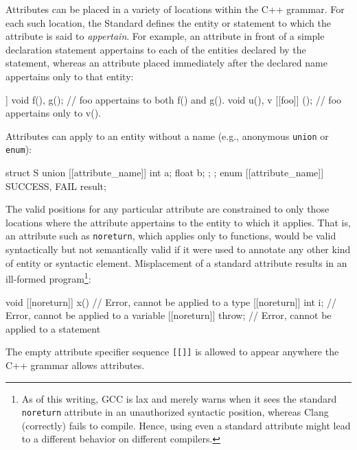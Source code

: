 Attributes can be placed in a variety of locations within the C++ grammar.  For each such location, the Standard defines the entity or statement to which the attribute is said to \emph{appertain}. For example, an attribute in front of a simple declaration statement appertains to each of the entities declared by the statement, whereas an attribute placed immediately after the declared name appertains only to that entity:

\begin{emcppslisting}[language=C]
[[foo]] void f(), g();   // foo appertains to both f() and g().
void u(), v [[foo]] ();  // foo appertains only to v().
\end{emcppslisting}

\noindent Attributes can apply to an entity without a name (e.g., anonymous \lstinline!union! or \lstinline!enum!):

\begin{emcppslisting}
struct S { union [[attribute_name]] { int a; float b; }; };
enum [[attribute_name]] { SUCCESS, FAIL } result;
\end{emcppslisting}

\noindent The valid positions for any particular attribute are constrained to only those locations
where the attribute appertains to the entity to which it applies. That is, an attribute such as \lstinline!noreturn!,
which applies only to functions, would be valid syntactically but not semantically valid if it were used to annotate
any other kind of entity or syntactic element.  Misplacement of a standard attribute results
in an ill-formed program\footnote{As of this writing, GCC is lax and merely
warns when it sees the standard \lstinline!noreturn! attribute in an
unauthorized syntactic position, whereas Clang (correctly) fails to
compile. Hence, using even a standard attribute might
  lead to a different behavior on different compilers.}:

\begin{emcppslisting}[emcppserrorlines={4}]
void [[noreturn]] x() {       // Error, cannot be applied to a type
     [[noreturn]] int i;      // Error, cannot be applied to a variable
     [[noreturn]] { throw; }  // Error, cannot be applied to a statement
}
\end{emcppslisting}

\noindent The empty attribute specifier sequence \lstinline![[]]! is allowed to appear anywhere the C++ grammar allows attributes.



